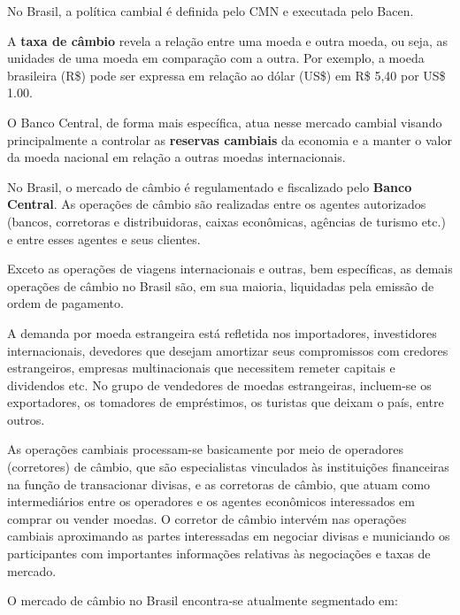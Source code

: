 \documentclass{article}\usepackage[]{graphicx}\usepackage[]{xcolor}
\begin{document}
No Brasil, a política cambial é definida pelo CMN e executada pelo Bacen.\par

A \textbf{taxa de câmbio} revela a relação entre uma moeda e outra moeda, ou seja, as unidades de uma moeda 
em comparação com a outra. Por exemplo, a moeda brasileira (R\$) pode ser expressa em relação ao 
dólar (US\$) em R\$ 5,40 por US\$ 1.00.\par

O Banco Central, de forma mais específica, atua nesse mercado cambial visando principalmente a 
controlar as \textbf{reservas cambiais} da economia e a manter o valor da moeda nacional em relação a outras 
moedas internacionais.\par

No Brasil, o mercado de câmbio é regulamentado e fiscalizado pelo \textbf{Banco Central}. As operações de 
câmbio são realizadas entre os agentes autorizados (bancos, corretoras e distribuidoras, caixas 
econômicas, agências de turismo etc.)  e entre esses agentes e seus clientes.\par

Exceto as operações de viagens internacionais e outras, bem específicas, as demais operações de câmbio 
no Brasil são, em sua maioria, liquidadas pela emissão de ordem de pagamento.\par

A demanda por moeda estrangeira está refletida nos importadores, investidores internacionais, 
devedores que desejam amortizar seus compromissos com credores estrangeiros, empresas multinacionais 
que necessitem remeter capitais e dividendos etc. No grupo de vendedores de moedas estrangeiras, 
incluem-se os exportadores, os tomadores de empréstimos, os turistas que deixam o país, entre outros.\par

As operações cambiais processam-se basicamente por meio de operadores (corretores) de câmbio, que são 
especialistas vinculados às instituições financeiras na função de transacionar divisas, e as corretoras 
de câmbio, que atuam como intermediários entre os operadores e os agentes econômicos interessados em 
comprar ou vender moedas. O corretor de câmbio intervém nas operações cambiais aproximando as partes 
interessadas em negociar divisas e municiando os participantes com importantes informações relativas 
às negociações e taxas de mercado.\par

O mercado de câmbio no Brasil encontra-se atualmente segmentado em:
\end{document}
